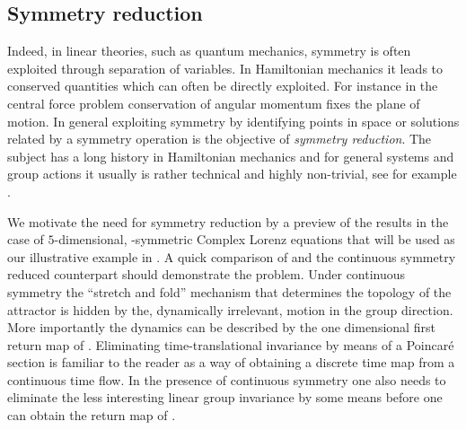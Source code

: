 \subsection{Symmetry reduction}

Indeed, in linear theories, such as quantum mechanics, symmetry is often exploited
through separation of variables. In Hamiltonian mechanics it leads to conserved quantities which can often be
directly exploited. For instance in the central force problem conservation of angular momentum fixes the plane
of motion. %
In general exploiting symmetry by identifying points in space or solutions
related by a symmetry operation is the objective of
\emph{symmetry reduction}. The subject has a long history in Hamiltonian mechanics and for general systems
and group actions it usually is rather technical and highly non-trivial, see for example
.

We motivate the need for symmetry reduction by a preview of the results in the case of $5$-dimensional,
-symmetric Complex Lorenz equations that will be used as our illustrative example in .
 A quick comparison of
 and the continuous symmetry reduced  counterpart should demonstrate the problem.
Under continuous symmetry the ``stretch and fold'' mechanism that determines the topology of the attractor
is hidden by the, dynamically irrelevant, motion in the group direction. More importantly the dynamics can
be described by the one dimensional first return map of . Eliminating time-translational
invariance by means of a Poincar\'e section is familiar to the reader as a way of obtaining a discrete time map from
a continuous time flow. In the presence of continuous symmetry one also needs to eliminate the less interesting
linear group invariance by some means before one can obtain the return map of .

